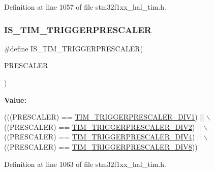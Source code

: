 Definition at line 1057 of file stm32f1xx\+\_\+hal\+\_\+tim.\+h.

\mbox{\label{group___t_i_m___private___macros_ga5756eafba610ec82cad88317c194cb81}} 
\subsubsection{\texorpdfstring{I\+S\+\_\+\+T\+I\+M\+\_\+\+T\+R\+I\+G\+G\+E\+R\+P\+R\+E\+S\+C\+A\+L\+ER}{IS\_TIM\_TRIGGERPRESCALER}}
{\footnotesize\ttfamily \#define I\+S\+\_\+\+T\+I\+M\+\_\+\+T\+R\+I\+G\+G\+E\+R\+P\+R\+E\+S\+C\+A\+L\+ER(\begin{DoxyParamCaption}\item[{}]{P\+R\+E\+S\+C\+A\+L\+ER }\end{DoxyParamCaption})}

{\bfseries Value\+:}
\begin{DoxyCode}
(((PRESCALER) == \hyperlink{group___t_i_m___trigger___prescaler_ga02ab6f24e367cd972a1e0c1df326a7a3}{TIM\_TRIGGERPRESCALER\_DIV1}) || \(\backslash\)
                                             ((PRESCALER) == 
      \hyperlink{group___t_i_m___trigger___prescaler_ga1350c5659a17a66df69b444871907d83}{TIM\_TRIGGERPRESCALER\_DIV2}) || \(\backslash\)
                                             ((PRESCALER) == 
      \hyperlink{group___t_i_m___trigger___prescaler_ga195dd56e15ea4733e19518fb431dfb8d}{TIM\_TRIGGERPRESCALER\_DIV4}) || \(\backslash\)
                                             ((PRESCALER) == 
      \hyperlink{group___t_i_m___trigger___prescaler_ga78edbcf4caf228de0daa4b7f698f578f}{TIM\_TRIGGERPRESCALER\_DIV8}))
\end{DoxyCode}


Definition at line 1063 of file stm32f1xx\+\_\+hal\+\_\+tim.\+h.

\mbox{\label{group___t_i_m___private___macros_gada7535acf7e1f9b3e8e1dcca848871db}} 
